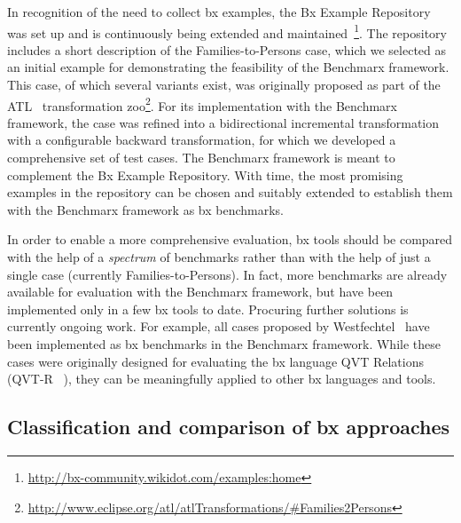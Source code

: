 In recognition of the need to collect bx examples, the Bx Example Repository~\cite{Cheney2014} was set up and is continuously being extended and maintained~\footnote{\url{http://bx-community.wikidot.com/examples:home}}.
The repository includes a short description of the Families-to-Persons case, which we selected as an initial example for demonstrating the feasibility of the Benchmarx framework.
This case, of which several variants exist, was originally proposed as part of the ATL~\cite{SCP-Jouault2008} transformation zoo\footnote{\url{http://www.eclipse.org/atl/atlTransformations/\#Families2Persons}}.
For its implementation with the Benchmarx framework, the case was refined into a bidirectional incremental transformation with a configurable backward transformation, for which we developed a comprehensive set of test cases.
The Benchmarx framework is meant to complement the Bx Example Repository.
With time, the most promising examples in the repository can be chosen and suitably extended to establish them with the Benchmarx framework as bx benchmarks.

In order to enable a more comprehensive evaluation, bx tools should be compared with the help of a \emph{spectrum} of benchmarks rather than with the help of just a single case (currently Families-to-Persons).
In fact, more benchmarks are already available for evaluation with the Benchmarx framework, but have been implemented only in a few bx tools to date.
Procuring further solutions is currently ongoing work.
For example, all cases proposed by Westfechtel~\cite{SoSym2018-Westfechtel} have been implemented as bx benchmarks in the Benchmarx framework.
While these cases were originally designed for evaluating the bx language QVT Relations (QVT-R ~\cite{QVT-1.3}), they can be meaningfully applied to other bx languages and tools.


\subsection{Classification and comparison of bx approaches}
\label{sec:ClassificationOfBxApproaches}

\cite{DBLP:conf/gttse/Diskin09}

\cite{DBLP:conf/ssgip/FosterMV10}

\cite{DBLP:journals/eceasst/EramoB13}

\cite{DBLP:journals/eceasst/HildebrandtLGRGSLAS13}
\cite{DBLP:journals/eceasst/LeblebiciASHRG14}


